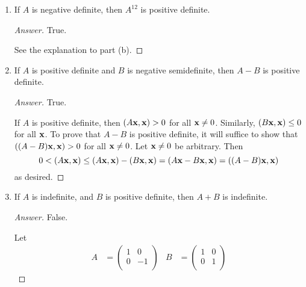 \documentclass[../psets.tex]{subfiles}
\begin{document}
\begin{enumerate}[label={\textbf{4.\arabic*.}}]
\begin{enumerate}
\begin{proof}[Answer]
            False.\par
            If $A$ is negative definite, then as before, $A=UDU^*$ and $A^8=UD^8U^*$. But if every entry along the diagonal of $D$ is negative (Theorem 7.4.1), then every diagonal along $D^8=(D^2)^4$ will be positive, so $A^8$ is not negative definite (it is, in fact, positive definite).
        \end{proof}
        \item If $A$ is negative definite, then $A^{12}$ is positive definite.
        \begin{proof}[Answer]
            True.\par
            See the explanation to part (b).
        \end{proof}
        \item If $A$ is positive definite and $B$ is negative semidefinite, then $A-B$ is positive definite.
        \begin{proof}[Answer]
            True.\par
            If $A$ is positive definite, then $(A\mathbf{x},\mathbf{x})>0$ for all $\mathbf{x}\neq 0$. Similarly, $(B\mathbf{x},\mathbf{x})\leq 0$ for all $\mathbf{x}$. To prove that $A-B$ is positive definite, it will suffice to show that $((A-B)\mathbf{x},\mathbf{x})>0$ for all $\mathbf{x}\neq 0$. Let $\mathbf{x}\neq 0$ be arbitrary. Then
            \begin{equation*}
                0 < (A\mathbf{x},\mathbf{x}) \leq (A\mathbf{x},\mathbf{x})-(B\mathbf{x},\mathbf{x}) = (A\mathbf{x}-B\mathbf{x},\mathbf{x}) = ((A-B)\mathbf{x},\mathbf{x})
            \end{equation*}
            as desired.
        \end{proof}
        \item If $A$ is indefinite, and $B$ is positive definite, then $A+B$ is indefinite.
        \begin{proof}[Answer]
            False.\par
            Let
            \begin{align*}
                A &=
                \begin{pmatrix}
                    1 & 0\\
                    0 & -1\\
                \end{pmatrix}&
                B &=
                \begin{pmatrix}
                    1 & 0\\
                    0 & 1\\
                \end{pmatrix}
            \end{align*}

\end{proof}
\end{enumerate}
\end{enumerate}
\end{document}
